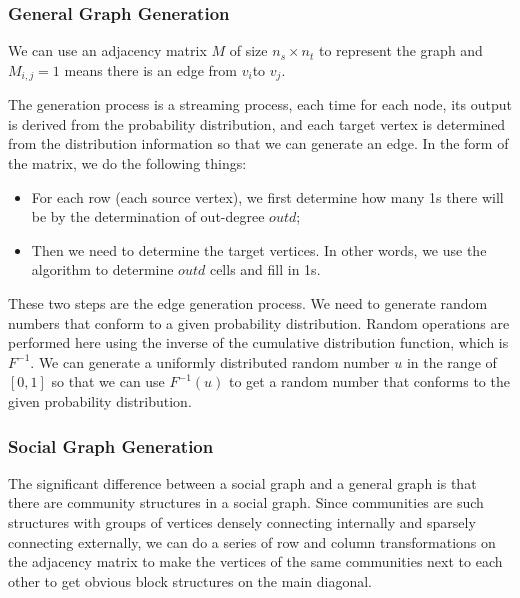 \begin{survey}
\vspace{0.2cm}

\subsubsection{General Graph Generation}

We can use an adjacency matrix \(M\) of size \(n_s\times n_t\) to
represent the graph and \(M_{i,j}=1\) means there is an edge from
\(v_i\)to \(v_j\).

The generation process is a streaming process, each time for each node,
its output is derived from the probability distribution, and each target
vertex is determined from the distribution information so that we can
generate an edge. In the form of the matrix, we do the following things:

\begin{itemize}
\item
  For each row (each source vertex), we first determine how many 1s
  there will be by the determination of out-degree \(outd\);
\item
  Then we need to determine the target vertices. In other words, we use
  the algorithm to determine \(outd\) cells and fill in 1s.
\end{itemize}

\vspace{0.2cm}

These two steps are the edge generation process. We need to generate
random numbers that conform to a given probability distribution. Random
operations are performed here using the inverse of the cumulative
distribution function, which is \(F^{-1}\). We can generate a uniformly
distributed random number \(u\) in the range of \([0, 1]\) so that we
can use \(F^{-1}(u)\) to get a random number that conforms to the given
probability distribution.

\subsubsection{Social Graph Generation}

The significant difference between a social graph and a general graph is
that there are community structures in a social graph. Since communities
are such structures with groups of vertices densely connecting
internally and sparsely connecting externally, we can do a series of row
and column transformations on the adjacency matrix to make the vertices
of the same communities next to each other to get obvious block
structures on the main diagonal.


\end{survey}
